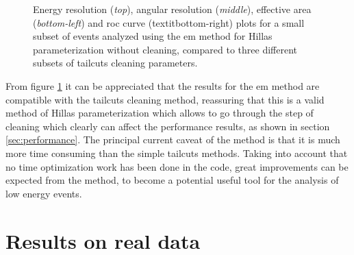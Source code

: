 \documentclass[main.tex]{subfiles}
\begin{document}
\begin{figure}
\endminipage
  \caption{Energy resolution (\textit{top}), angular resolution (\textit{middle}), effective area (\textit{bottom-left}) and \gls{roc} curve (textit{bottom-right}) plots for a small subset of events analyzed using the \gls{em} method for Hillas parameterization without cleaning, compared to three different subsets of tailcuts cleaning parameters. }
    \label{fig:em_res}
\end{figure}

From figure \ref{fig:em_res} it can be appreciated that the results for the \gls{em} method are compatible with the tailcuts cleaning method, reassuring that this is a valid method of Hillas parameterization which allows to go through the step of cleaning which clearly can affect the performance results, as shown in section \ref{sec:performance}. The principal current caveat of the method is that it is much more time consuming than the simple tailcuts methods. Taking into account that no time optimization work has been done in the code, great improvements can be expected from the method, to become a potential useful tool for the analysis of low energy events. 

\section{Results on real data}
\end{document}
